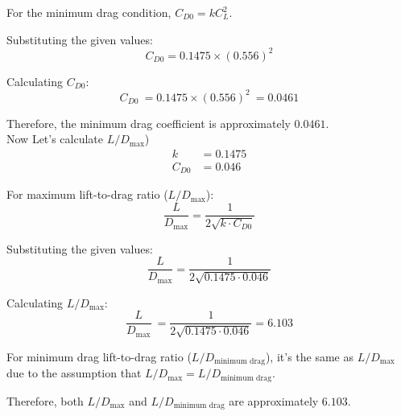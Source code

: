 \documentclass[12 pt]{article}
\begin{document}
For the minimum drag condition, \( C_{D0} = kC_L^2 \).

Substituting the given values:
\[
C_{D0} = 0.1475 \times (0.556)^2
\]

Calculating \( C_{D0} \):
\[
C_{D0} \ = 0.1475 \times (0.556)^2 \ = 0.0461
\]

Therefore, the minimum drag coefficient is approximately \(0.0461\).\\
Now Let's calculate \( L/D_{\text{max}} \))
\begin{align*}
    k & = 0.1475 \\
    C_{D0} & = 0.046
\end{align*}

For maximum lift-to-drag ratio (\( L/D_{\text{max}} \)):
\[
\frac{L}{D_{\text{max}}} = \frac{1}{2\sqrt{k \cdot C_{D0}}}
\]

Substituting the given values:
\[
\frac{L}{D_{\text{max}}} = \frac{1}{2\sqrt{0.1475 \cdot 0.046}}
\]

Calculating \( L/D_{\text{max}} \):
\[
\frac{L}{D_{\text{max}}} \ =  \frac{1}{2\sqrt{0.1475 \cdot 0.046}} = 6.103
\]

For minimum drag lift-to-drag ratio (\( L/D_{\text{minimum drag}} \)), it's the same as \( L/D_{\text{max}} \) due to the assumption that \( L/D_{\text{max}} = L/D_{\text{minimum drag}} \).

Therefore, both \( L/D_{\text{max}} \) and \( L/D_{\text{minimum drag}} \) are approximately \(6.103\).
\end{document}

